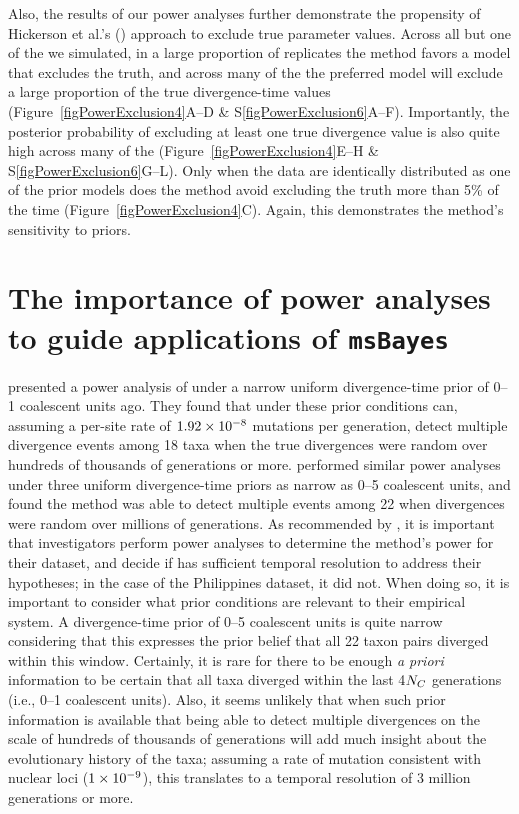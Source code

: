 Also, the results of our power analyses further demonstrate the propensity of
Hickerson et al.'s (\citeyear{Hickerson2013}) approach to exclude true
parameter values.
Across all but one of the  we simulated, in a large proportion of
replicates the method favors a model that excludes the truth, and across many
of the  the preferred model will exclude a large proportion of the
true divergence-time values (Figure~\ref{figPowerExclusion4}A--D \&
S\ref{figPowerExclusion6}A--F).
Importantly, the posterior probability of excluding at least one true
divergence value is also quite high across many of the 
(Figure~\ref{figPowerExclusion4}E--H \& S\ref{figPowerExclusion6}G--L).
Only when the data are identically distributed as one of the prior models does
the method avoid excluding the truth more than 5\% of the time
(Figure~\ref{figPowerExclusion4}C).
Again, this demonstrates the method's sensitivity to priors.



\section{The importance of power analyses to guide applications of \texttt{msBayes}}
\citet{Hickerson2013} presented a power analysis of \msb under a narrow uniform
divergence-time prior of 0--1 coalescent units ago.
They found that under these prior conditions \msb can, assuming a
per-site rate of $1.92\times 10^{-8}$ mutations per generation, detect multiple
divergence events among 18 taxa when the true divergences were random over
hundreds of thousands of generations or more.
\citet{Oaks2012} performed similar power analyses under three uniform
divergence-time priors as narrow as 0--5 coalescent units, and found the
method was able to detect multiple events among 22 when divergences were random
over millions of generations.
As recommended by \citet{Oaks2012}, it is important that investigators perform
power analyses to determine the method's power for their dataset, and decide if
\msb has sufficient temporal resolution to address their hypotheses; in the
case of the Philippines dataset, it did not.
When doing so, it is important to consider what prior conditions are
relevant to their empirical system.
A divergence-time prior of 0--5 coalescent units is quite narrow considering
that this expresses the prior belief that all 22 taxon pairs diverged within
this window.
Certainly, it is  rare for there to be enough \emph{a priori} information to
be certain that all taxa diverged within the last 4$N_C$ generations
(i.e., 0--1 coalescent units).
Also, it seems unlikely that when such prior information is available that
being able to detect multiple divergences on the scale of hundreds of thousands
of generations will add much insight about the evolutionary history of the
taxa; assuming a rate of mutation consistent with nuclear loci ($1\times 10^{-9}$),
this translates to a temporal resolution of 3 million generations or more.

